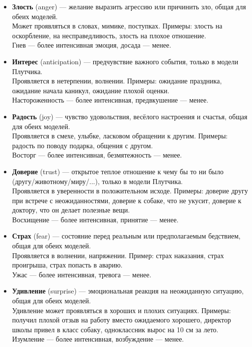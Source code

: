 \bigskip
\begin{itemize}
\item \textbf{Злость} (anger) --- желание выразить агрессию или причинить зло, общая для обеих моделей.\\
Может проявляться в словах, мимике, поступках.
Примеры: злость на оскорбление, на несправедливость, злость на плохое отношение.\\
Гнев --- более интенсивная эмоция, досада --- менее.

\item \textbf{Интерес} (anticipation) --- предчувствие важного события, только в модели Плутчика.\\
Проявляется в нетерпении, волнении.
Примеры: ожидание праздника, ожидание начала каникул, ожидание плохой оценки.\\
Настороженность --- более интенсивная, предвкушение --- менее.

\item \textbf{Радость} (joy) --- чувство удовольствия, весёлого настроения и счастья, общая для обеих моделей.\\
Проявляется в смехе, улыбке, ласковом обращении к другим.
Примеры: радость по поводу подарка, общения с другом.\\
Восторг --- более интенсивная, безмятежность --- менее.

\item \textbf{Доверие} (trust) --- ​открытое теплое отношение к чему бы то ни было (другу/животному/миру/...), только в модели Плутчика.\\
Проявляется в уверенности в положительном исходе.
Примеры: доверие другу при встрече с неожиданностями, доверие к собаке, что не укусит, доверие к доктору, что он делает полезные вещи.\\
Восхищение --- более интенсивная, принятие --- менее.

\item \textbf{Страх} (fear) --- состояние перед реальным или предполагаемым бедствием, общая для обеих моделей.\\
Проявляется в волнении, напряжении.
Пример: страх наказания, страх проигрыша, страх попасть в аварию.\\
Ужас --- более интенсивная, тревога --- менее.

\item \textbf{Удивление} (surprise) --- эмоциональная реакция на неожиданную ситуацию, общая для обеих моделей.\\
Удивление может проявляться в хороших и плохих ситуациях.
Примеры: получил плохой отзыв на работу вместо ожидаемого хорошего, директор школы привел в класс собаку, одноклассник вырос на 10 см за лето.\\
Изумление --- более интенсивная, возбуждение --- менее.



\end{itemize}
